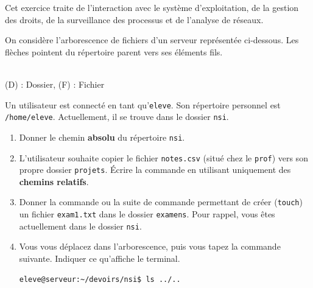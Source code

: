 \begin{Exercise}[title={Systèmes d'exploitation, gestion des fichiers et des processus}]

Cet exercice traite de l'interaction avec le système d'exploitation, de la gestion des droits, de la surveillance des processus et de l'analyse de réseaux.


On considère l'arborescence de fichiers d'un serveur représentée ci-dessous. Les flèches pointent du répertoire parent vers ses éléments fils.

\begin{center}
\\ \small (D) : Dossier, (F) : Fichier
\end{center}

\Question Un utilisateur est connecté en tant qu'\texttt{eleve}. Son répertoire personnel est \texttt{/home/eleve}. Actuellement, il se trouve dans le dossier \texttt{nsi}.
\begin{enumerate}
    \item Donner le chemin \textbf{absolu} du répertoire \texttt{nsi}.
    \item L'utilisateur souhaite copier le fichier \texttt{notes.csv} (situé chez le \texttt{prof}) vers son propre dossier \texttt{projets}. Écrire la commande en utilisant uniquement des \textbf{chemins relatifs}.
    \item Donner la commande ou la suite de commande permettant de créer (\texttt{touch}) un fichier \texttt{exam1.txt} dans le dossier \texttt{examens}. Pour rappel, vous êtes actuellement dans le dossier \texttt{nsi}.
    \item Vous vous déplacez dans l'arborescence, puis vous tapez la commande suivante. Indiquer ce qu'affiche le terminal.
\begin{lstlisting}[language=bash]
eleve@serveur:~/devoirs/nsi$ ls ../..\end{lstlisting}


\end{enumerate}
\end{Exercise}
